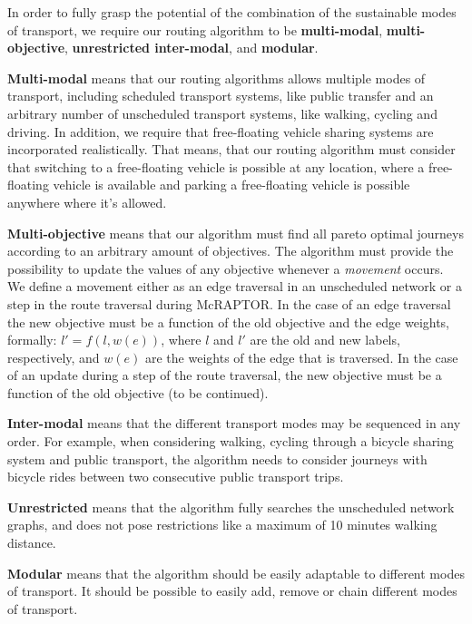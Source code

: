 In order to fully grasp the potential of the combination of the sustainable modes of transport, we require our routing algorithm to be \textbf{multi-modal}, \textbf{multi-objective}, \textbf{unrestricted inter-modal}, and \textbf{modular}.

\textbf{Multi-modal} means that our routing algorithms allows multiple modes of transport, including scheduled transport systems, like public transfer and an arbitrary number of unscheduled transport systems, like walking, cycling and driving.
In addition, we require that free-floating vehicle sharing systems are incorporated realistically.
That means, that our routing algorithm must consider that switching to a free-floating vehicle is possible at any location, where a free-floating vehicle is available and parking a free-floating vehicle is possible anywhere where it's allowed.

\textbf{Multi-objective} means that our algorithm must find all pareto optimal journeys according to an arbitrary amount of objectives.
The algorithm must provide the possibility to update the values of any objective whenever a \textit{movement} occurs.
We define a movement either as an edge traversal in an unscheduled network or a step in the route traversal during McRAPTOR.
In the case of an edge traversal the new objective must be a function of the old objective and the edge weights, formally: \(l' = f(l, w(e))\), where \(l\) and \(l'\) are the old and new labels, respectively, and \(w(e)\) are the weights of the edge that is traversed.
In the case of an update during a step of the route traversal, the new objective must be a function of the old objective (to be continued).

\textbf{Inter-modal} means that the different transport modes may be sequenced in any order.
For example, when considering walking, cycling through a bicycle sharing system and public transport, the algorithm needs to consider journeys with bicycle rides between two consecutive public transport trips.

\textbf{Unrestricted} means that the algorithm fully searches the unscheduled network graphs, and does not pose restrictions like a maximum of 10 minutes walking distance.

\textbf{Modular} means that the algorithm should be easily adaptable to different modes of transport.
It should be possible to easily add, remove or chain different modes of transport.


